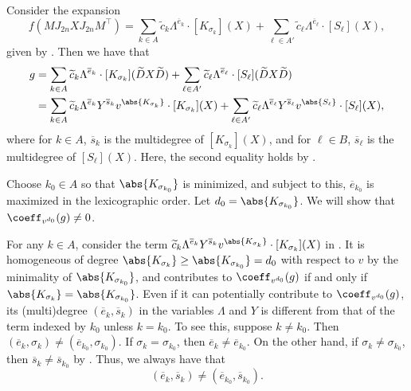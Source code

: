 \documentclass[letterpaper, 11pt]{amsart}
\begin{document}
\begin{pf}
Consider the expansion
\[
        f(M J_{2n} X J_{2n} M^\top) = \sum_{k \in A} \widetilde{c}_{k} \Lambda^{\overline{e}_k}\cdot [K_{\sigma_k}](X) + \sum_{\ell\in A'} \widetilde{c}_{\ell} \Lambda^{\overline{e}_\ell}\cdot [S_\ell](X),
\]
given by .
Then we have that
\begin{equation}\label{eq:expansion-g_pfaff}
\begin{aligned}
    g &= \sum_{k \in A} \widetilde{c}_{k} \Lambda^{\overline{e}_k}\cdot [K_{\sigma_k}](\widetilde{D} X \widetilde{D}) + \sum_{\ell\in A'} \widetilde{c}_{\ell} \Lambda^{\overline{e}_\ell}\cdot [S_\ell](\widetilde{D} X \widetilde{D}) \\
      &= \sum_{k \in A} \widetilde{c}_{k} \Lambda^{\overline{e}_k} Y^{\overline{s}_k} v^{\abs{K_{\sigma_k}}} \cdot [K_{\sigma_k}](X) + \sum_{\ell\in A'} \widetilde{c}_{\ell} \Lambda^{\overline{e}_\ell} Y^{\overline{s}_\ell} v^{\abs{S_\ell}} \cdot [S_\ell](X),
\end{aligned}
\end{equation}
where for $k\in A$, $\overline{s}_k$ is the multidegree of $[K_{\sigma_k}](X)$, and for $\ell \in B$, $\overline{s}_\ell$ is the multidegree of $[S_\ell](X)$.
Here, the second equality holds by .

Choose $k_0 \in A$ so that $\abs{K_{\sigma_{k_0}}}$ is minimized, and subject to this, $\overline{e}_{k_0}$ is maximized in the lexicographic order.
Let $d_0 = \abs{K_{\sigma_{k_0}}}$.
We will show that $\coeff_{v^{d_0}}(g)\neq 0$.


For any $k\in A$, consider the term $\widetilde{c}_{k} \Lambda^{\overline{e}_k} Y^{\overline{s}_k} v^{\abs{K_{\sigma_k}}} \cdot [K_{\sigma_k}](X)$ in .
It is homogeneous of degree $\abs{K_{\sigma_k}} \geq \abs{K_{\sigma_{k_0}}} = d_0$ with respect to $v$ by the minimality of $\abs{K_{\sigma_{k_0}}}$, and contributes to $\coeff_{v^{d_0}}(g)$ if and only if $\abs{K_{\sigma_k}} = \abs{K_{\sigma_{k_0}}}$.
Even if it can potentially contribute to $\coeff_{v^{d_0}}(g)$, its (multi)degree $(\overline{e}_k, \overline{s}_k)$ in the variables $\Lambda$ and $Y$ is different from that of the term indexed by $k_0$ unless $k = k_0$.
To see this, suppose $k \neq k_0$.
Then $(\overline{e}_k, \sigma_k) \neq (\overline{e}_{k_0} ,\sigma_{k_0})$.
If $\sigma_k = \sigma_{k_0}$, then $\overline{e}_k \neq \overline{e}_{k_0}$.
On the other hand, if $\sigma_k \neq \sigma_{k_0}$, then $\overline{s}_k \neq \overline{s}_{k_0}$ by .
Thus, we always have that
\[
    (\overline{e}_k, \overline{s}_k) \neq (\overline{e}_{k_0},\overline{s}_{k_0}).
\]


\end{pf}
\end{document}
